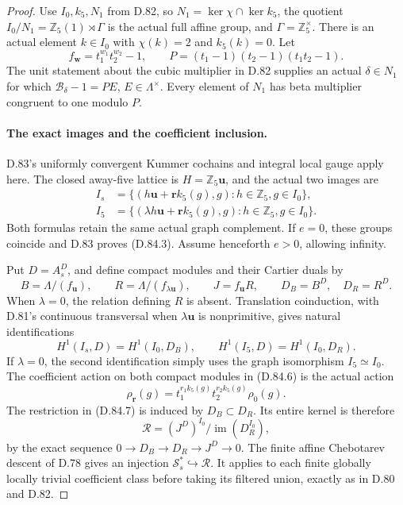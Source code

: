 \begin{proof}
Use \(I_0,k_5,N_1\) from D.82, so
\(N_1=\ker\chi\cap\ker k_5\), the quotient
\(I_0/N_1=\mathbb Z_5(1)\rtimes\Gamma\) is the actual full
affine group, and \(\Gamma=\mathbb Z_5^\times\).
There is an actual element \(k\in I_0\) with
\(\chi(k)=2\) and \(k_5(k)=0\).
Let
\[
 f_{\mathbf w}=t_1^{w_1}t_2^{w_2}-1,\qquad
 P=(t_1-1)(t_2-1)(t_1t_2-1).
\]
The unit statement about the cubic multiplier in D.82 supplies
an actual \(\delta\in N_1\) for which
\(\mathcal B_\delta-1=P E\), \(E\in\Lambda^\times\).
Every element of \(N_1\) has beta multiplier congruent to one
modulo \(P\).

\paragraph{The exact images and the coefficient inclusion.}
D.83's uniformly convergent Kummer cochains and integral local
gauge apply here. The closed away-five lattice is
\(H=\mathbb Z_5\mathbf u\), and the actual two images are
\[
 \begin{split}
 I_s&=\{(h\mathbf u+\mathbf r k_5(g),g):h\in\mathbb Z_5,g\in I_0\},\\
 I_5&=\{(\lambda h\mathbf u+\mathbf r k_5(g),g):
                                      h\in\mathbb Z_5,g\in I_0\}.
 \end{split}                                                     \tag{D.84.5}
\]
Both formulas retain the same actual graph complement. If
\(e=0\), these groups coincide and D.83 proves (D.84.3).
Assume henceforth \(e>0\), allowing infinity.

Put \(D=A_s^D\), and define compact modules and their Cartier
duals by
\[
 B=\Lambda/(f_{\mathbf u}),\qquad
 R=\Lambda/(f_{\lambda\mathbf u}),\qquad
 J=f_{\mathbf u}R,\qquad D_B=B^D,\quad D_R=R^D.
                                                                  \tag{D.84.6}
\]
When \(\lambda=0\), the relation defining \(R\) is absent.
Translation coinduction, with D.81's continuous transversal
when \(\lambda\mathbf u\) is nonprimitive, gives natural
identifications
\[
 H^1(I_s,D)=H^1(I_0,D_B),\qquad
 H^1(I_5,D)=H^1(I_0,D_R).
                                                                  \tag{D.84.7}
\]
If \(\lambda=0\), the second identification simply uses
the graph isomorphism \(I_5\simeq I_0\).
The coefficient action on both compact modules in (D.84.6)
is the actual action
\[
             \rho_{\mathbf r}(g)=
                 t_1^{r_1k_5(g)}t_2^{r_2k_5(g)}\rho_0(g).
                                                                  \tag{D.84.8}
\]
The restriction in (D.84.7) is induced by \(D_B\subset D_R\).
Its entire kernel is therefore
\[
 \mathcal R=
       (J^D)^{I_0}/\operatorname{im}(D_R^{I_0}),
                                                                  \tag{D.84.9}
\]
by the exact sequence \(0\to D_B\to D_R\to J^D\to0\).
The finite affine Chebotarev descent of D.78 gives an injection
\(\mathcal S_s^*\hookrightarrow\mathcal R\). It applies to
each finite globally locally trivial coefficient class before
taking its filtered union, exactly as in D.80 and D.82.


\end{proof}
